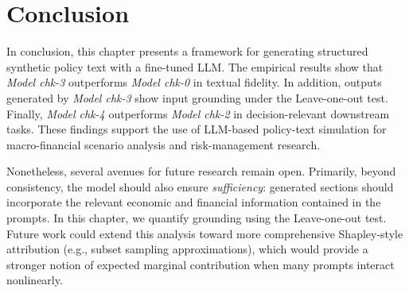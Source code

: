 \section{Conclusion}\label{ch2:sec:conclusion}

In conclusion, this chapter presents a framework for generating structured synthetic policy text with a fine-tuned LLM. The empirical results show that \textit{Model chk-3} outperforms \textit{Model chk-0} in textual fidelity. In addition, outputs generated by \textit{Model chk-3} show input grounding under the Leave-one-out test. Finally, \textit{Model chk-4} outperforms \textit{Model chk-2} in decision-relevant downstream tasks. These findings support the use of LLM-based policy-text simulation for macro-financial scenario analysis and risk-management research.

Nonetheless, several avenues for future research remain open. Primarily, beyond consistency, the model should also ensure \textit{sufficiency}: generated sections should incorporate the relevant economic and financial information contained in the prompts. In this chapter, we quantify grounding using the Leave-one-out test. Future work could extend this analysis toward more comprehensive Shapley-style attribution (e.g., subset sampling approximations), which would provide a stronger notion of expected marginal contribution when many prompts interact nonlinearly.

